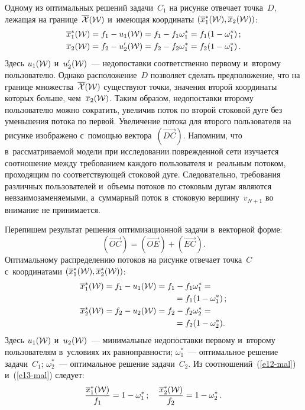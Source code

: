 \begin{multicols}{2}
Одному из оптимальных решений задачи~$C_1$ на рисунке отвечает точка~$D$, 
лежащая на границе~$\overline{{\cal X}}({\cal W})$ и~имеющая координаты $(\overline x_1^*({\cal W}), \overline x_2({\cal W}))$:
\begin{align*}
 \overline x_1^*({\cal W}) &= f_1 - u_1({\cal W}) = f_1 - f_1\omega^*_1 = f_1 (1 - \omega^*_1)\,; \\
 \overline x_2({\cal W}) &=f_2 - u_2'({\cal W}) = f_2 - f_2\omega^*_1 = f_2 (1 - \omega^*_1)\,. 
 \end{align*}
Здесь $u_1({\cal W})$ и~$u_2'({\cal W})$~--- недопоставки соответственно первому и~второму 
пользователю.
Однако расположение~$D$ позволяет сделать предположение, что на границе 
множества~$\overline{{\cal X}}({\cal W})$ существуют точки, значения 
второй координаты которых больше, 
чем~$\overline x_2({\cal W})$.
Таким образом, недопоставки второму пользователю можно сократить, увеличив 
поток по второй стоковой дуге без уменьшения потока по первой. Увеличение 
потока для второго пользователя на рисунке изображено с~помощью  
вектора~$(\overrightarrow{DC})$.
Напомним, что в~рассматриваемой модели при исследовании поврежденной 
сети изучается соотношение между требованием каждого пользователя и~реальным 
потоком, проходящим по соответствующей стоковой дуге. Следовательно, 
требования различных пользователей и~объемы потоков по стоковым дугам 
являются невзаимозаменяемыми, а~суммарный поток в~стоковую вершину~$v_{N+1}$ 
во внимание не принимается.

Перепишем результат решения оптимизационной задачи в~векторной форме:
$$
 (\overrightarrow{OC}) = (\overrightarrow{OE}) + (\overrightarrow{EC}). 
 $$
Оптимальному распределению потоков на рисунке отвечает  точка~$C$ с~координатами
$(\overline x_1^*({\cal W}), \overline x_2^*({\cal W}))$:
\begin{align}
\overline x_1^*({\cal W}) &= f_1- u_1({\cal W}) = f_1 - f_1\omega^*_1 ={}\notag\\
&\hspace*{30mm}{}= f_1 
(1 - \omega^*_1)\,; \label{e12-mal}\\
\overline x_2^*({\cal W}) &=f_2 - u_2({\cal W}) = f_2 - f_2\omega^*_2 ={}\notag\\
&\hspace*{30mm}{}= f_2 (1 - \omega^*_2).\label{e13-mal}
\end{align}
Здесь $u_1({\cal W})$ и~$u_2({\cal W})$~--- минимальные недопоставки первому и~второму 
пользователям в~условиях их равноправности;
$\omega_1^*$~--- оптимальное решение задачи~$C_1$; 
$\omega_2^*$~--- оптимальное решение задачи~$C_2$. Из соотношений~(\ref{e12-mal})
и~(\ref{e13-mal}) 
следует:
\begin{equation}
  \displaystyle\frac{\displaystyle \overline x_1^*({\cal W})\mathstrut}{\displaystyle f_1\mathstrut}  =  1 - \omega^*_1\,; \quad
    \displaystyle\frac{\displaystyle \overline x_2^*({\cal W})\mathstrut}{\displaystyle f_2\mathstrut}  =  1 - \omega^*_2\,.
    \label{e14-mal}
    \end{equation}


\end{multicols}
